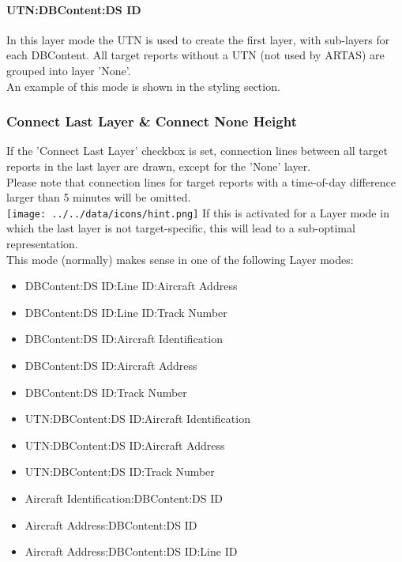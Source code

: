 \paragraph{UTN:DBContent:DS ID}

In this layer mode the UTN is used to create the first layer, with sub-layers for each DBContent. All target reports without a UTN (not used by ARTAS) are grouped into layer 'None'.  \\

An example of this mode is shown in the styling section.


\subsubsection{Connect Last Layer \& Connect None Height}

If the 'Connect Last Layer' checkbox is set, connection lines between all target reports in the last layer are drawn, except for the 'None' layer. \\

Please note that connection lines for target reports with a time-of-day difference larger than 5 minutes will be omitted. \\

\texttt{[image: ../../data/icons/hint.png]} If this is activated for a Layer mode in which the last layer is not target-specific, this will lead to a sub-optimal representation. \\

This mode (normally) makes sense in one of the following Layer modes:

\begin{itemize}
\item DBContent:DS ID:Line ID:Aircraft Address
\item DBContent:DS ID:Line ID:Track Number
\item DBContent:DS ID:Aircraft Identification
\item DBContent:DS ID:Aircraft Address
\item DBContent:DS ID:Track Number
\item UTN:DBContent:DS ID:Aircraft Identification
\item UTN:DBContent:DS ID:Aircraft Address
\item UTN:DBContent:DS ID:Track Number
\item Aircraft Identification:DBContent:DS ID
\item Aircraft Address:DBContent:DS ID
\item Aircraft Address:DBContent:DS ID:Line ID
\end{itemize}
\  \\


